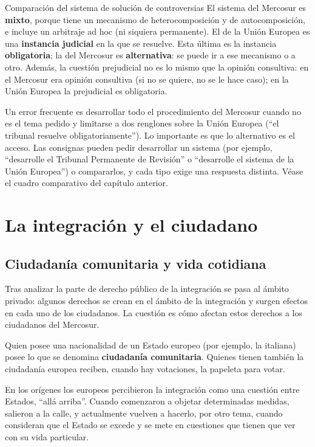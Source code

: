 \documentclass[12pt,oneside]{book}
\begin{document}
\begin{example}{Comparación del sistema de solución de controversias}
El sistema del Mercosur es \textbf{mixto}, porque tiene un mecanismo de heterocomposición y de autocomposición, e incluye un arbitraje ad hoc (ni siquiera permanente). El de la Unión Europea es una \textbf{instancia judicial} en la que se resuelve. Esta última es la instancia \textbf{obligatoria}; la del Mercosur es \textbf{alternativa}: se puede ir a ese mecanismo o a otro. Además, la cuestión prejudicial no es lo mismo que la opinión consultiva: en el Mercosur era opinión consultiva (si no se quiere, no se le hace caso); en la Unión Europea la prejudicial es obligatoria.
\end{example}

Un error frecuente es desarrollar todo el procedimiento del Mercosur cuando no es el tema pedido y limitarse a dos renglones sobre la Unión Europea (``el tribunal resuelve obligatoriamente''). Lo importante es que lo alternativo es el acceso. Las consignas pueden pedir desarrollar un sistema (por ejemplo, ``desarrolle el Tribunal Permanente de Revisión'' o ``desarrolle el sistema de la Unión Europea'') o compararlos, y cada tipo exige una respuesta distinta. Véase el cuadro comparativo del capítulo anterior.

\chapter[La integración y el ciudadano]{La integración y el ciudadano}

\section{Ciudadanía comunitaria y vida cotidiana}

Tras analizar la parte de derecho público de la integración se pasa al ámbito privado: algunos derechos se crean en el ámbito de la integración y surgen efectos en cada uno de los ciudadanos. La cuestión es cómo afectan estos derechos a los ciudadanos del Mercosur.

Quien posee una nacionalidad de un Estado europeo (por ejemplo, la italiana) posee lo que se denomina \textbf{ciudadanía comunitaria}. Quienes tienen también la ciudadanía europea reciben, cuando hay votaciones, la papeleta para votar.

En los orígenes los europeos percibieron la integración como una cuestión entre Estados, ``allá arriba''. Cuando comenzaron a objetar determinadas medidas, salieron a la calle, y actualmente vuelven a hacerlo, por otro tema, cuando consideran que el Estado se excede y se mete en cuestiones que tienen que ver con su vida particular.
\end{document}
